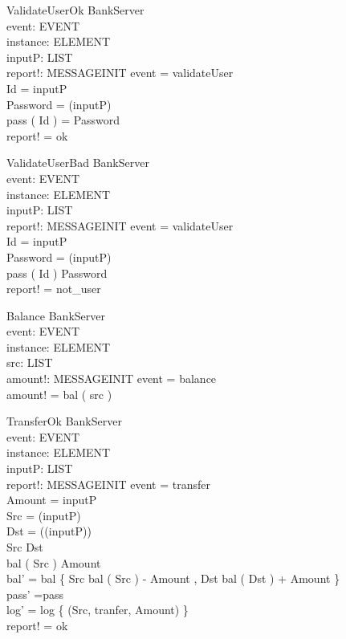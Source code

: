 \begin{schema}{ValidateUserOk}
\Delta BankServer \\
event: EVENT \\
instance: ELEMENT \\
inputP: LIST \\
report!: MESSAGEINIT
\where event = validateUser \\
Id = \head inputP \\
Password = \head (\tail inputP) \\
pass ( Id ) = Password  \\
report! = ok 
\end{schema}


\begin{schema}{ValidateUserBad}
\Delta BankServer \\
event: EVENT \\
instance: ELEMENT \\
inputP: LIST \\
report!: MESSAGEINIT
\where event = validateUser \\
Id = \head inputP \\
Password = \head (\tail inputP) \\
pass ( Id ) \neq Password  \\
report! = not\_user
\end{schema}

\begin{schema}{Balance}
\Xi BankServer \\
event: EVENT \\
instance: ELEMENT \\
src: LIST \\
amount!: MESSAGEINIT
\where event = balance \\
amount! = bal ( src ) 
\end{schema}

\begin{schema}{TransferOk}
\Delta BankServer \\
event: EVENT \\
instance: ELEMENT \\
inputP: LIST \\
report!: MESSAGEINIT
\where event = transfer \\
Amount = \head inputP \\
Src = \head (\tail inputP) \\
Dst = \head (\tail (\tail inputP)) \\
Src \neq Dst \\
bal ( Src ) \geq Amount  \\
bal' = bal \oplus  \{ Src \map bal ( Src ) - Amount , Dst \map bal ( Dst ) + Amount \} \\
pass' =pass \\
log' = log \uni \{ (Src, tranfer, Amount) \} \\
report! = ok 
\end{schema}

